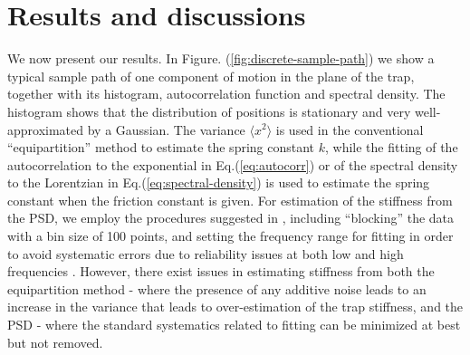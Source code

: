 \documentclass[fleqn,10pt]{wlscirep}
\begin{document}
\section*{Results and discussions}
We now present our results. In Figure. (\ref{fig:discrete-sample-path})
we show a typical sample path of one component of motion in the plane
of the trap, together with its histogram, autocorrelation function
and spectral density. The histogram shows that the distribution of
positions is stationary and very well-approximated by a Gaussian.
The variance $\langle x^{2}\rangle$ is used in the conventional ``equipartition''
method to estimate the spring constant $k$, while the fitting of
the autocorrelation to the exponential in Eq.(\ref{eq:autocorr})
or of the spectral density to the Lorentzian in Eq.(\ref{eq:spectral-density})
is used to estimate the spring constant when the friction constant
is given. For estimation of the stiffness from the PSD, we employ
the procedures suggested in \cite{berg2004power}, including ``blocking''
the data with a bin size of 100 points, and setting the frequency
range for fitting in order to avoid systematic errors due to reliability
issues at both low and high frequencies \cite{berg2004power}. However,
there exist issues in estimating stiffness from both the equipartition
method - where the presence of any additive noise leads to an increase
in the variance that leads to over-estimation of the trap stiffness,
and the PSD - where the standard systematics related to fitting can
be minimized at best but not removed. 
\end{document}

